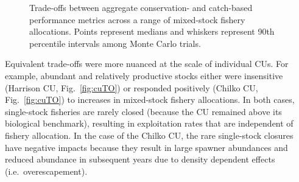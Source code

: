 \documentclass[11pt]{book}
\begin{document}
\begin{figure}[htb]

{\centering {} 

}

\caption{Trade-offs between aggregate conservation- and catch-based performance metrics across a range of mixed-stock fishery allocations. Points represent medians and whiskers represent 90th percentile intervals among Monte Carlo trials.}\label{fig:aggTO}
\end{figure}
Equivalent trade-offs were more nuanced at the scale of individual CUs. For example, abundant and relatively productive stocks either were insensitive (Harrison CU, Fig.~\ref{fig:cuTO}) or responded positively (Chilko CU, Fig.~\ref{fig:cuTO}) to increases in mixed-stock fishery allocations. In both cases, single-stock fisheries are rarely closed (because the CU remained above its biological benchmark), resulting in exploitation rates that are independent of fishery allocation. In the case of the Chilko CU, the rare single-stock closures have negative impacts because they result in large spawner abundances and reduced abundance in subsequent years due to density dependent effects (i.e.~overescapement).
\end{document}
